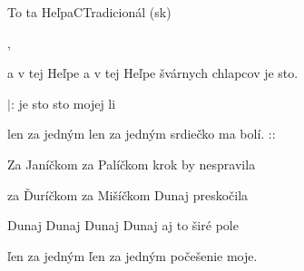 \setcounter{page}{90}
\begin{song}{To ta Heľpa}{C}{Tradicionál (sk)}

\begin{SBVerse}

      ,

a v tej Heľpe a v tej Heľpe švárnych chlapcov je sto.

$|$:  je sto  sto  mojej li

len za jedným len za jedným srdiečko ma bolí. :$:$

\end{SBVerse}

\begin{SBVerse}

Za Janíčkom za Palíčkom krok by nespravila

za Ďuríčkom za Mišíčkom Dunaj preskočila

Dunaj Dunaj Dunaj Dunaj aj to širé pole

ľen za jedným ľen za jedným počešenie moje.

\end{SBVerse}

\end{song}

\clearpage
